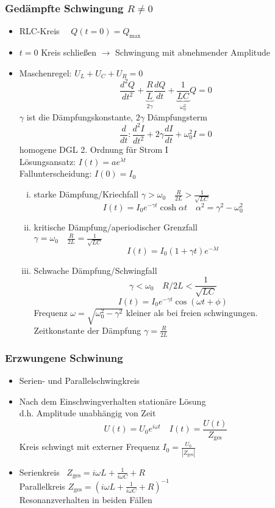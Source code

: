 \documentclass[titlepage,12pt,a4paper,ngerman]{report}
\newcommand{\tx}[1]{\textrm{#1}}
\newcommand{\ub}[1]{\underbrace{#1}}
\begin{document}
 \subsubsection{Gedämpfte Schwingung $ R \neq 0 $}
 \begin{itemize}
 	\item RLC-Kreis $ \quad Q(t=0) = Q_{\tx{max}} $
 	\item $ t=0 $ Kreis schließen $ \rightarrow $ Schwingung mit abnehmender Amplitude
 	\item Maschenregel: $ U_L + U_C + U_R = 0 $\\
 	$$\frac{d^2 Q}{dt^2} + \ub{\frac{R}{L}}_{2 \gamma} \frac{dQ}{dt} + \ub{\frac{1}{LC}}_{\omega^2_0} Q = 0 $$
 	$ \gamma $ ist die Dämpfungskonstante, $ 2 \gamma $ Dämpfungsterm
 	$$ \frac{d}{dt} : \frac{d^2I}{dt^2} + 2 \gamma \frac{dI}{dt} + \omega^2_0 I = 0 $$
 	homogene DGL 2. Ordnung für Strom I\\
 	Lösungsansatz: $ I(t) = a e ^{\lambda t} $\\
 	Fallunterscheidung: $ I(0) = I_0 $
 	\begin{enumerate}[i)]
 		\item starke Dämpfung/Kriechfall $ \gamma > \omega_0 \quad \frac{R}{2L} > \frac{1}{\sqrt{LC}} $\\
 		$$ I(t) = I_0 e^{-\gamma t} \cosh \alpha t \quad \alpha^2 = \gamma^2 - \omega^2_0 $$
 		\item kritische Dämpfung/aperiodischer Grenzfall\\
 		$ \gamma = \omega_0 \quad \frac{R}{2L} = \frac{1}{\sqrt{LC}} $\\
 		$$ I(t) = I_0 (1+\gamma t) e ^{-\lambda t} $$
 		\item Schwache Dämpfung/Schwingfall
 		$$\gamma < \omega_0 \quad R/2L < \frac{1}{\sqrt{LC}}$$
 		$$I(t) = I_0 e^{-\gamma t} \cos (\omega t + \phi)$$
 		Frequenz $\omega = \sqrt{\omega_0^2 - \gamma^2}$ kleiner als bei freien schwingungen.\\
 		Zeitkonstante der Dämpfung $\gamma = \frac{R}{2L}$
 	\end{enumerate}
 \end{itemize}
 \subsubsection{Erzwungene Schwinung}
 \begin{itemize}
 	\item Serien- und Parallelschwingkreis
 	\item Nach dem Einschwingverhalten stationäre Lösung\\
 	d.h. Amplitude unabhängig von Zeit
 	$$U(t) = U_0 e^{i\omega t} \quad I(t) = \frac{U(t)}{Z_{\tx{ges}}} $$
 	Kreis schwingt mit externer Frequenz $ I_0 = \frac{U_0}{|Z_{\tx{ges}}|} $
 	\item Serienkreis $\ \; Z_{\tx{ges}} = i \omega L + \frac{1}{i \omega C} + R $\\
 	Parallelkreis $ Z_{\tx{ges}} = (i \omega L + \frac{1}{i \omega C} + R)^{-1} $\\
 	Resonanzverhalten in beiden Fällen
 \end{itemize}
\end{document}
